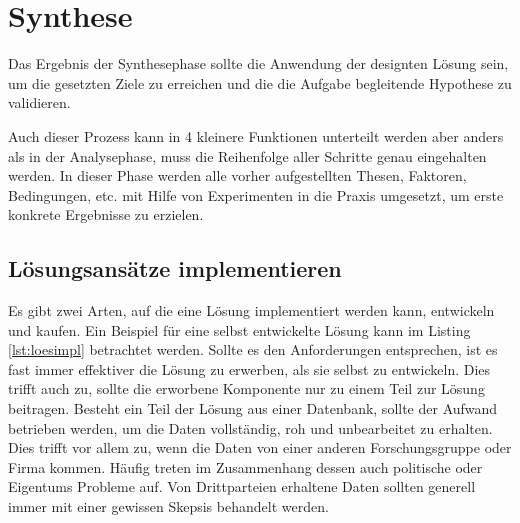 \section{Synthese} \label{chap:3}

Das Ergebnis der Synthesephase sollte die Anwendung der designten Lösung sein, um die gesetzten Ziele 
zu erreichen und die die Aufgabe begleitende Hypothese zu validieren.

Auch dieser Prozess kann in 4 kleinere Funktionen unterteilt werden aber anders als in der 
Analysephase, muss die Reihenfolge aller Schritte genau eingehalten werden. In dieser Phase werden 
alle vorher aufgestellten Thesen, Faktoren, Bedingungen, etc. mit Hilfe von Experimenten in die 
Praxis umgesetzt, um erste konkrete Ergebnisse zu erzielen.


    \subsection{Lösungsansätze implementieren}

    Es gibt zwei Arten, auf die eine Lösung implementiert werden kann, entwickeln und kaufen. 
    Ein Beispiel für eine selbst entwickelte Lösung kann im Listing \ref{lst:loesimpl} betrachtet werden.
    Sollte es den Anforderungen entsprechen, ist es fast immer effektiver die Lösung zu erwerben, 
    als sie selbst zu entwickeln. Dies trifft auch zu, sollte die erworbene Komponente nur zu einem 
    Teil zur Lösung beitragen. 
    Besteht ein Teil der Lösung aus einer Datenbank, sollte der Aufwand betrieben werden, um die Daten 
    vollständig, roh und unbearbeitet zu erhalten. Dies trifft vor allem zu, wenn die Daten von einer 
    anderen Forschungsgruppe oder Firma kommen. Häufig treten im Zusammenhang dessen auch politische 
    oder Eigentums Probleme auf. Von Drittparteien erhaltene Daten sollten generell immer mit einer 
    gewissen Skepsis behandelt werden.


